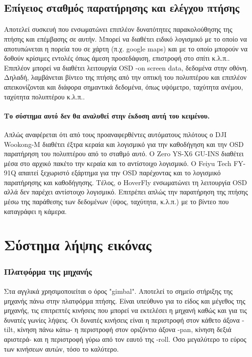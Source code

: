 \documentclass[a4paper, 12pt, twoside]{report}
\begin{document}
{{{{{{		\subsection{Επίγειος σταθμός παρατήρησης και ελέγχου πτήσης}
			\paragraph{}{Αποτελεί συσκευή που ενσωματώνει επιπλέον δυνατότητες παρακολούθησης της πτήσης και επέμβασης σε αυτήν. Μπορεί να διαθέτει ειδικό λογισμικό με το οποίο να αποτυπώνεται η πορεία του σε χάρτη (π.χ. google maps) και με το οποίο μπορούν να δοθούν κρίσιμες εντολές όπως άμεση προσεδάφιση, επιστροφή στο σπίτι κ.λ.π.. Επιπλέον μπορεί να διαθέτει λειτουργία OSD -on screen data, δεδομένα στην οθόνη. Δηλαδή, λαμβάνεται βίντεο της πτήσης από την οπτική του πολυπτέρου και επιπλέον απεικονίζονται και διάφορα σημαντικά δεδομένα, όπως υψόμετρο, ταχύτητα ανέμου, ταχύτητα πολυπτέρου κ.λ.π..
			}
			\paragraph{Το σύστημα αυτό δεν θα αναλυθεί στην έκδοση αυτή του κειμένου.}{Απλώς αναφέρεται ότι από τους προαναφερθέντες αυτόματους πιλότους ο DJI Wookong-M διαθέτει έξτρα κεραία και λογισμικό για την καθοδήγηση και την OSD παρατήρηση του πολυπτέρου από το σταθμό αυτό. Ο Zero YS-X6 GU-INS διαθέτει μέσα στο αρχικό πακέτο την κεραία και το αντίστοιχο λογισμικό. Ο Feiyu Tech FY-91Q απαιτεί ξεχωριστό εξάρτημα για την OSD παρέχοντας και το λογισμικό παρατήρησης και καθοδήγησης. Τέλος, ο HoverFly ενσωματώνει τη λειτουργία OSD αλλά δεν παρέχει αντίστοιχο λογισμικό. Επιτρέπει απλώς την παρατήρηση της πτήσης μέσω της παράθεσης των δεδομένων (ύψος, ταχύτητα, κ.λ.π.) με το βίντεο που καταγράφει η κάμερα.
			}
			
			
		\section{Σύστημα λήψης εικόνας}
		
		\subsubsection{Πλατφόρμα της μηχανής}
			\paragraph{}{Στα αγγλικά χρησιμοποιείται ο όρος "gimbal". Αποτελεί το σημείο στήριξης της μηχανής πάνω στην πλατφόρμα πτήσης. Είναι υπεύθυνο για το είδος και μέγεθος της μηχανής, τις επιτρεπτές κινήσεις που μπορεί να εκτελέσει η μηχανή καθώς και για τις δυνατές γωνίες λήψεις. Οι δυνατές κινήσεις είναι η περιστροφή στον κάθετο άξονα -tilt, κίνηση πάνω κάτω- η περιστροφή στον οριζόντιο άξονα -pan, κίνηση δεξιά αριστερά- και η περιστροφή γύρω από τον εαυτό της -roll. Όσο μεγαλύτερο το εύρος των κινήσεων αυτών, τόσο το καλύτερο.
			}
			
}}}}}}
\end{document}
